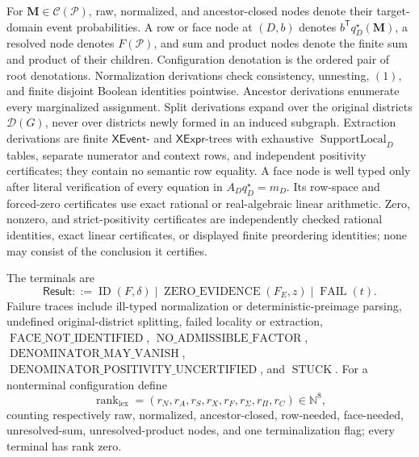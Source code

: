 For \(\mathbf M\in\mathcal C(\mathcal P)\), raw, normalized, and ancestor-closed nodes denote their target-domain event probabilities.  A row or face node at \((D,b)\) denotes \(b^{\mathsf T}q_D^\star(\mathbf M)\), a resolved node denotes \(F(\mathcal P)\), and sum and product nodes denote the finite sum and product of their children.  Configuration denotation is the ordered pair of root denotations.  Normalization derivations check consistency, unnesting, \((1)\), and finite disjoint Boolean identities pointwise.  Ancestor derivations enumerate every marginalized assignment.  Split derivations expand over the original districts \(\mathcal D(G)\), never over districts newly formed in an induced subgraph.  Extraction derivations are finite \(\mathsf{XEvent}\)- and \(\mathsf{XExpr}\)-trees with exhaustive \(\operatorname{SupportLocal}_D\) tables, separate numerator and context rows, and independent positivity certificates; they contain no semantic row equality.  A face node is well typed only after literal verification of every equation in \(A_Dq_D^\star=m_D\).  Its row-space and forced-zero certificates use exact rational or real-algebraic linear arithmetic.  Zero, nonzero, and strict-positivity certificates are independently checked rational identities, exact linear certificates, or displayed finite preordering identities; none may consist of the conclusion it certifies.

The terminals are
\[
\mathsf{Result}::=
\operatorname{ID}(F,\delta)
\mid\operatorname{ZERO\_EVIDENCE}(F_E,z)
\mid\operatorname{FAIL}(t).
\]
Failure traces include ill-typed normalization or deterministic-preimage parsing, undefined original-district splitting, failed locality or extraction, \(\operatorname{FACE\_NOT\_IDENTIFIED}\), \(\operatorname{NO\_ADMISSIBLE\_FACTOR}\), \(\operatorname{DENOMINATOR\_MAY\_VANISH}\), \(\operatorname{DENOMINATOR\_POSITIVITY\_UNCERTIFIED}\), and \(\operatorname{STUCK}\).  For a nonterminal configuration define
\[
\operatorname{rank}_{\mathrm{lex}}
=(r_N,r_A,r_S,r_X,r_F,r_\Sigma,r_\Pi,r_C)\in\mathbb N^8,
\]
counting respectively raw, normalized, ancestor-closed, row-needed, face-needed, unresolved-sum, unresolved-product nodes, and one terminalization flag; every terminal has rank zero.